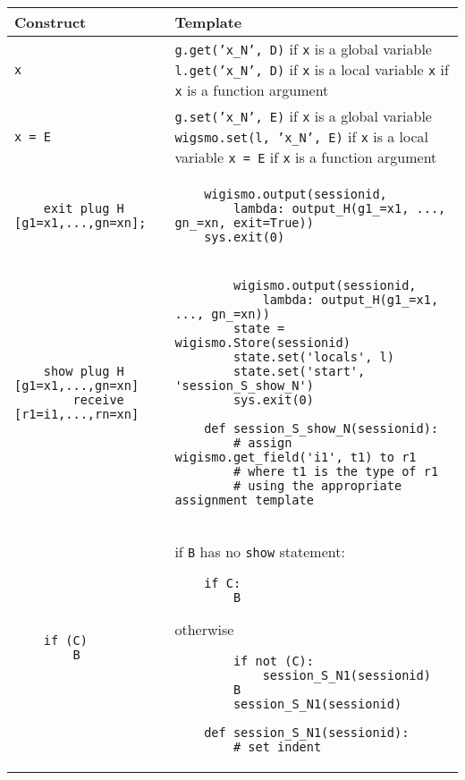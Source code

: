 \documentclass{WigReport}
\begin{document}
\noindent
\begin{tabular}{| p{20em} | p{30em} |}
    \hline
    Construct & Template \\ \hline
    {\tt x}
    &
    {\tt g.get('x\_N', D)} \newline
    if {\tt x} is a global variable \newline
    {\tt l.get('x\_N', D)} \newline
    if {\tt x} is a local variable \newline
    {\tt x} \newline
    if {\tt x} is a function argument
    \\ \hline
    {\tt x = E}
    & 
    {\tt g.set('x\_N', E)} \newline
    if {\tt x} is a global variable \newline
    {\tt wigsmo.set(l, 'x\_N', E)} \newline
    if {\tt x} is a local variable \newline
    {\tt x = E} \newline
    if {\tt x} is a function argument  
    \\ \hline
    \begin{verbatim} 
    exit plug H [g1=x1,...,gn=xn];
    \end{verbatim}
    & 
    \begin{verbatim}
    wigismo.output(sessionid, 
        lambda: output_H(g1_=x1, ..., gn_=xn, exit=True))
    sys.exit(0)
    \end{verbatim}
    \\ \hline       
    \begin{verbatim} 
    show plug H [g1=x1,...,gn=xn]
        receive [r1=i1,...,rn=xn]
    \end{verbatim}
    & 
    \begin{verbatim}
        wigismo.output(sessionid,
            lambda: output_H(g1_=x1, ..., gn_=xn))
        state = wigismo.Store(sessionid)
        state.set('locals', l)
        state.set('start', 'session_S_show_N')
        sys.exit(0)

    def session_S_show_N(sessionid):
        # assign wigismo.get_field('i1', t1) to r1
        # where t1 is the type of r1
        # using the appropriate assignment template
    \end{verbatim}
    \\ \hline       
    \begin{verbatim} 
    if (C)
        B
    \end{verbatim}
    & 
    if {\tt B} has no {\tt show} statement:
    \begin{verbatim}
    if C:
        B
    \end{verbatim}
    otherwise
    \begin{verbatim}
        if not (C):
            session_S_N1(sessionid)
        B
        session_S_N1(sessionid)

    def session_S_N1(sessionid):
        # set indent
    \end{verbatim}
    \\ \hline       
    \end{tabular}
\end{document}
